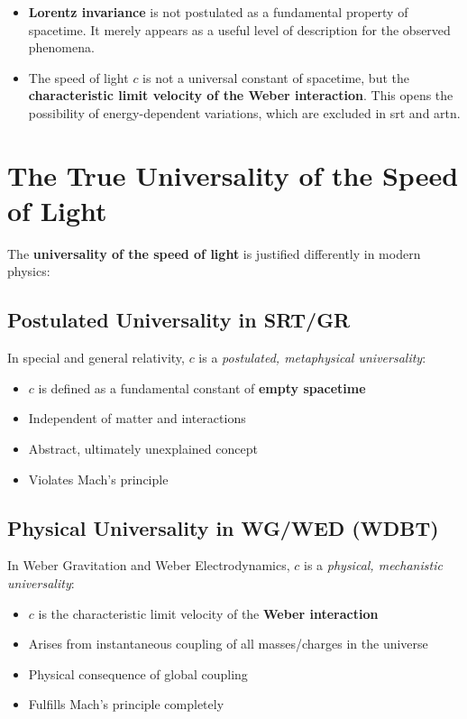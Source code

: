 \begin{itemize}
    \item \textbf{Lorentz invariance} is not postulated as a fundamental property of spacetime. It merely appears as a useful level of description for the observed phenomena.
    \item The speed of light $c$ is not a universal constant of spacetime, but the \textbf{characteristic limit velocity of the Weber interaction}. This opens the possibility of energy-dependent variations, which are excluded in \gls{srt} and \gls{artn}.
\end{itemize}

\section{The True Universality of the Speed of Light}

The \textbf{universality of the speed of light} is justified differently in modern physics:

\subsection{Postulated Universality in SRT/GR}
In special and general relativity, $c$ is a \textit{postulated, metaphysical universality}:
\begin{itemize}
    \item $c$ is defined as a fundamental constant of \textbf{empty spacetime}
    \item Independent of matter and interactions
    \item Abstract, ultimately unexplained concept
    \item Violates Mach's principle
\end{itemize}

\subsection{Physical Universality in WG/WED (WDBT)}
In Weber Gravitation and Weber Electrodynamics, $c$ is a \textit{physical, mechanistic universality}:
\begin{itemize}
    \item $c$ is the characteristic limit velocity of the \textbf{Weber interaction}
    \item Arises from instantaneous coupling of all masses/charges in the universe
    \item Physical consequence of global coupling
    \item Fulfills Mach's principle completely
\end{itemize}

